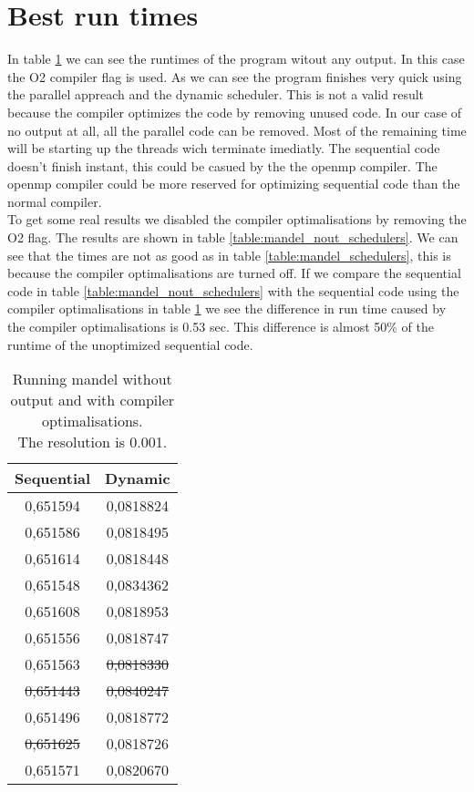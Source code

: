 \documentclass[a4paper]{article}
\begin{document}
\section{Best run times}
	In table \ref{table:mandel_nout_o3} we can see the runtimes of the program witout any output.
	In this case the O2 compiler flag is used.
	As we can see the program finishes very quick using the parallel appreach and the dynamic scheduler.
	This is not a valid result because the compiler optimizes the code by removing unused code.
	In our case of no output at all, all the parallel code can be removed.
	Most of the remaining time will be starting up the threads wich terminate imediatly.
	The sequential code doesn't finish instant, this could be casued by the the openmp compiler.
	The openmp compiler could be more reserved for optimizing sequential code than the normal compiler.\\
	To get some real results we disabled the compiler optimalisations by removing the O2 flag.
	The results are shown in table \ref{table:mandel_nout_schedulers}.
	We can see that the times are not as good as in table \ref{table:mandel_schedulers}, this is because the compiler optimalisations are turned off.
	If we compare the sequential code in table \ref{table:mandel_nout_schedulers} with the sequential code using the compiler optimalisations in table \ref{table:mandel_nout_o3}
	we see the difference in run time caused by the compiler optimalisations is 0.53 sec.
	This difference is almost 50\% of the runtime of the unoptimized sequential code.\\
	
	\begin{table}[h]
		\caption{Running mandel without output and with compiler optimalisations.\\The resolution is 0.001.}
		\label{table:mandel_nout_o3}
		\begin{center}
			\begin{tabular}{| c | c |}
				\hline
				Sequential & Dynamic\\ 
				\hline
				0,651594 & 0,0818824\\ 
				0,651586 & 0,0818495\\ 
				0,651614 & 0,0818448\\ 
				0,651548 & 0,0834362\\ 
				0,651608 & 0,0818953\\ 
				0,651556 & 0,0818747\\ 
				0,651563 & \st{0,0818330}\\ 
				\st{0,651443} & \st{0,0840247}\\ 
				0,651496 & 0,0818772\\ 
				\st{0,651625} & 0,0818726\\ 
				\hline
				0,651571 & 0,0820670\\ 
				\hline
			\end{tabular}
		\end{center}
	\end{table}
	
\end{document}

